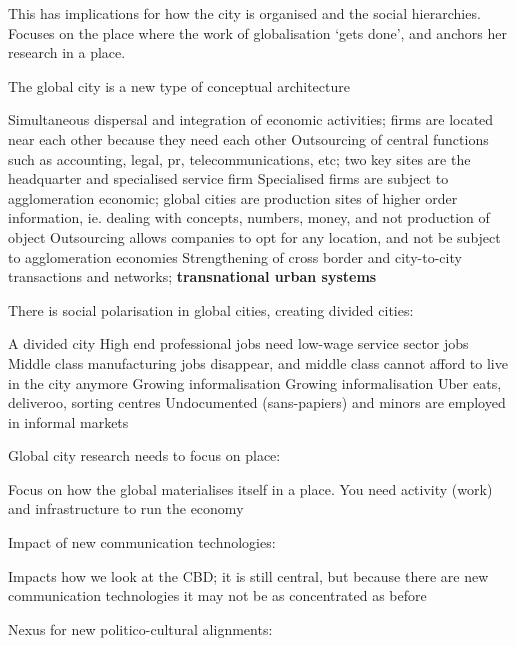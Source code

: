 \documentclass{article}
\begin{document}
This has implications for how the city is organised and the social hierarchies. 
Focuses on the place where the work of globalisation `gets done', and anchors her research in a place.

The global city is a new type of conceptual architecture

\begin{outline}
	\1 Simultaneous dispersal and integration of economic activities; firms are located near each other because they need each other
	\1 Outsourcing of central functions such as accounting, legal, pr, telecommunications, etc; two key sites are the headquarter and specialised service firm
	\1 Specialised firms are subject to agglomeration economic; global cities are production sites of higher order information, ie. dealing with concepts, numbers, money, and not production of object
	\1 Outsourcing allows companies to opt for any location, and not be subject to agglomeration economies
	\1 Strengthening of cross border and city-to-city transactions and networks; \textbf{transnational urban systems}
\end{outline}

There is social polarisation in global cities, creating divided cities:

\begin{outline}
	\1 A divided city
		\2 High end professional jobs need low-wage service sector jobs
		\2 Middle class manufacturing jobs disappear, and middle class cannot afford to live in the city anymore
		\2 Growing informalisation
	\1 Growing informalisation
		\2 Uber eats, deliveroo, sorting centres
		\2 Undocumented (sans-papiers) and minors are employed in informal markets
\end{outline}

Global city research needs to focus on place:

\begin{outline}
	\1 Focus on how the global materialises itself in a place.
	\1 You need activity (work) and infrastructure to run the economy
\end{outline}

Impact of new communication technologies:

\begin{outline}
	\1 Impacts how we look at the CBD; it is still central, but because there are new communication technologies it may not be as concentrated as before
\end{outline}

Nexus for new politico-cultural alignments:
\end{document}
